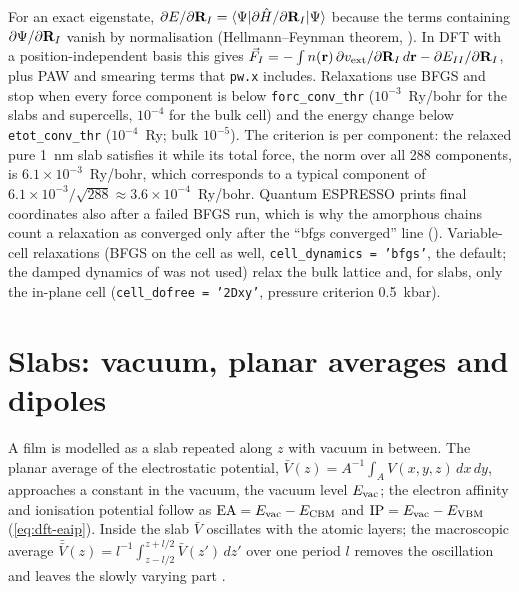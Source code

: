 For an exact eigenstate, $\partial E/\partial\mathbf{R}_I = \langle\Psi|\partial\hat{H}/\partial\mathbf{R}_I|\Psi\rangle$ because the
terms containing $\partial\Psi/\partial\mathbf{R}_I$ vanish by normalisation (Hellmann--Feynman theorem, \citealp{Feynman1939}).
In DFT with a position-independent basis this gives $\vec F_I = -\int n(\mathbf{r})\,\partial v_{\mathrm{ext}}/\partial\mathbf{R}_I\,d\mathbf{r} -
\partial E_{II}/\partial\mathbf{R}_I$, plus PAW and smearing terms that \texttt{pw.x} includes. Relaxations use BFGS
\citep{Billeter2003} and stop when every force component is below \texttt{forc\_conv\_thr} ($10^{-3}$~Ry/bohr for
the slabs and supercells, $10^{-4}$ for the bulk cell) and the energy change below \texttt{etot\_conv\_thr}
($10^{-4}$~Ry; bulk $10^{-5}$). The criterion is per component: the relaxed pure 1~nm slab
satisfies it while its total force, the norm over all 288 components, is $6.1\times10^{-3}$~Ry/bohr, which corresponds
to a typical component of $6.1\times10^{-3}/\sqrt{288} \approx 3.6\times10^{-4}$~Ry/bohr. Quantum ESPRESSO prints final
coordinates also after a failed BFGS run, which is why the amorphous chains count a relaxation as converged only after
the ``bfgs converged'' line (). Variable-cell relaxations (BFGS on the cell as well, \texttt{cell\_dynamics = 'bfgs'}, the default; the damped
dynamics of \citealp{Wentzcovitch1991} was not used) relax the bulk lattice and, for slabs, only the in-plane cell
(\texttt{cell\_dofree = '2Dxy'}, pressure criterion 0.5~kbar).

\section{Slabs: vacuum, planar averages and dipoles}
\label{sec:mono-dft-slab}

A film is modelled as a slab repeated along $z$ with vacuum in between. The planar average of the electrostatic
potential, $\bar V(z) = A^{-1}\int_A V(x,y,z)\,dx\,dy$, approaches a constant in the vacuum, the vacuum level
$E_{\mathrm{vac}}$; the electron affinity and ionisation potential follow as $\mathrm{EA} = E_{\mathrm{vac}} - E_{\mathrm{CBM}}$ and
$\mathrm{IP} = E_{\mathrm{vac}} - E_{\mathrm{VBM}}$ (\cref{eq:dft-eaip}). Inside the slab $\bar V$ oscillates with the atomic layers;
the macroscopic average $\bar{\bar V}(z) = l^{-1}\int_{z-l/2}^{z+l/2}\bar V(z')\,dz'$ over one period $l$ removes the
oscillation and leaves the slowly varying part \citep{Baldereschi1988}.

